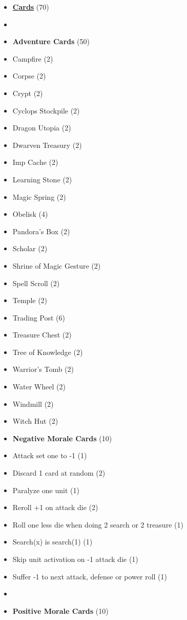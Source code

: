 \begin{multicols}{3}
\begin{itemize}[leftmargin=0pt, label={}, noitemsep]
  \item \textbf{\small{\underline{Cards}}} (70)
  \item
  \item \textbf{Adventure Cards} (50)
  \item Campfire (2)
  \item Corpse (2)
  \item Crypt (2)
  \item Cyclops Stockpile (2)
  \item Dragon Utopia (2)
  \item Dwarven Treasury (2)
  \item Imp Cache (2)
  \item Learning Stone (2)
  \item Magic Spring (2)
  \item Obelisk (4)
  \item Pandora's Box (2)
  \item Scholar (2)
  \item Shrine of Magic Gesture (2)
  \item Spell Scroll (2)
  \item Temple (2)
  \item Trading Post (6)
  \item Treasure Chest (2)
  \item Tree of Knowledge (2)
  \item Warrior's Tomb (2)
  \item Water Wheel (2)
  \item Windmill (2)
  \item Witch Hut (2)
\columnbreak
  \item \textbf{Negative Morale Cards} (10)
  \item Attack set one to -1 (1)
  \item Discard 1 card at random (2)
  \item Paralyze one unit (1)
  \item Reroll +1 on attack die (2)
  \item Roll one less die when doing 2 search or 2 treasure (1)
  \item Search(x) is search(1) (1)
  \item Skip unit activation on -1 attack die (1)
  \item Suffer -1 to next attack, defense or power roll (1)
  \item
  \item \textbf{Positive Morale Cards} (10)

\end{itemize}
\end{multicols}
